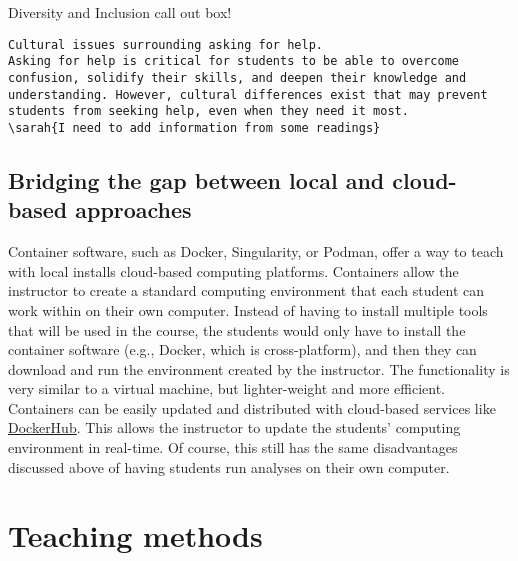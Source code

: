 {\begin{framed}
Diversity and Inclusion call out box! 
\begin{snugshade*}
\begin{lstlisting}
Cultural issues surrounding asking for help.
Asking for help is critical for students to be able to overcome confusion, solidify their skills, and deepen their knowledge and understanding. However, cultural differences exist that may prevent students from seeking help, even when they need it most. 
\sarah{I need to add information from some readings}
\end{lstlisting}
\end{snugshade*}
\end{framed}}

\subsection{Bridging the gap between local and cloud-based approaches}

Container software, such as
Docker,
Singularity,
or
Podman,
offer a way to  teach with local installs 
cloud-based computing platforms.
Containers allow the instructor to create a standard computing environment that
each student can work within on their own computer.
Instead of having to install multiple tools that will be used in the course,
the students would only have to install the container software (e.g., Docker,
which is cross-platform), and then they can download and run the environment
created by the instructor.
The functionality is very similar to a virtual machine, but lighter-weight and
more efficient.
Containers can be easily updated and distributed with cloud-based
services like
\href{https://hub.docker.com/}{DockerHub}.
This allows the instructor to update the students' computing environment in
real-time.
Of course, this still has the same disadvantages discussed above of having
students run analyses on their own computer.

\section{Teaching methods}

